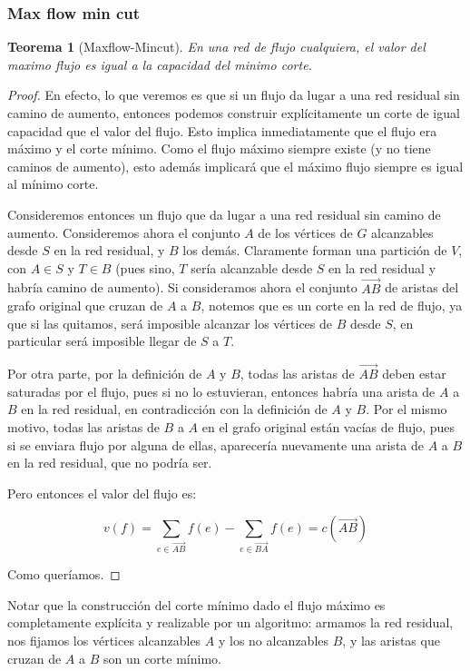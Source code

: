 \documentclass{article}
\newtheorem{teorema}{{\sc Teorema}}
\begin{document}
\subsubsection{Max flow min cut}

\begin{teorema}[Maxflow-Mincut]
    En una red de flujo cualquiera, el valor del maximo flujo es igual a la capacidad del minimo corte.
\end{teorema}
\begin{proof}

En efecto, lo que veremos es que si un flujo da lugar a una red residual sin camino de aumento, entonces podemos construir explícitamente un
corte de igual capacidad que el valor del flujo. Esto implica inmediatamente que el flujo era máximo y el corte mínimo. Como el flujo máximo
siempre existe (y no tiene caminos de aumento), esto además implicará que el máximo flujo siempre es igual al mínimo corte.

Consideremos entonces un flujo que da lugar a una red residual sin camino de aumento. Consideremos ahora el conjunto $A$ de los vértices de
$G$ alcanzables desde $S$ en la red residual, y $B$ los demás. Claramente forman una partición de $V$, con $A \in S$ y $T \in B$ (pues sino,
$T$ sería alcanzable desde $S$ en la red residual y habría camino de aumento). Si consideramos ahora el conjunto $\overrightarrow{AB}$ de
aristas del grafo original que cruzan de $A$ a $B$, notemos que es un corte en la red de flujo, ya que si las quitamos, será imposible
alcanzar los vértices de $B$ desde $S$, en particular será imposible llegar de $S$ a $T$.

Por otra parte, por la definición de $A$ y $B$, todas las aristas de $\overrightarrow{AB}$ deben estar saturadas por el flujo, pues si no
lo estuvieran, entonces habría una arista de $A$ a $B$ en la red residual, en contradicción con la definición de $A$ y $B$. Por el mismo
motivo, todas las aristas de $B$ a $A$ en el grafo original están vacías de flujo, pues si se enviara flujo por alguna de ellas, aparecería
nuevamente una arista de $A$ a $B$ en la red residual, que no podría ser.

Pero entonces el valor del flujo es:

$$v(f) = \sum_{e \in \overrightarrow{AB}}{f(e)} - \sum_{e \in \overrightarrow{BA}}{f(e)} = c(\overrightarrow{AB})$$

Como queríamos. 
\end{proof}

Notar que la construcción del corte mínimo dado el flujo máximo es completamente explícita y realizable por un algoritmo:
armamos la red residual, nos fijamos los vértices alcanzables $A$ y los no alcanzables $B$, y las aristas que cruzan de $A$ a $B$ son un
corte mínimo.
\end{document}
